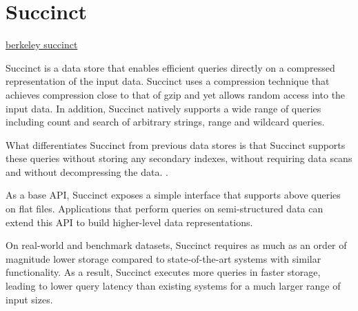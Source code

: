 \section{Succinct}
\href{http://succinct.cs.berkeley.edu/}{berkeley succinct}

Succinct is a data store that enables efficient queries directly on a compressed representation of the input data.
Succinct uses a compression technique that achieves compression close to that of gzip and yet allows random access into the input data.
In addition, Succinct natively supports a wide range of queries including count and search of arbitrary strings, range and wildcard queries.

What differentiates Succinct from previous data stores is that Succinct supports these queries without storing any secondary indexes, without requiring data scans and without decompressing the data.
.

As a base API, Succinct exposes a simple interface that supports above queries on flat files.
Applications that perform queries on semi-structured data can extend this API to build higher-level data representations.

On real-world and benchmark datasets, Succinct requires as much as an order of magnitude lower storage compared to state-of-the-art systems with similar functionality.
As a result, Succinct executes more queries in faster storage, leading to lower query latency than existing systems for a much larger range of input sizes.

